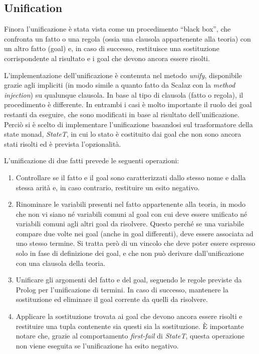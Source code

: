 \subsection{Unification}

Finora l'unificazione è stata vista come un procedimento ``black box'', che confronta un fatto o una regola (ossia una clausola appartenente alla teoria) con un altro fatto (goal) e, in caso di successo, restituisce una sostituzione corrispondente al risultato e i goal che devono ancora essere risolti.

L'implementazione dell'unificazione è contenuta nel metodo \textit{unify}, disponibile grazie agli impliciti (in modo simile a quanto fatto da Scalaz con la \textit{method injection}) su qualunque clausola. In base al tipo di clausola (fatto o regola), il procedimento è differente. In entrambi i casi è molto importante il ruolo dei goal restanti da eseguire, che sono modificati in base al risultato dell'unificazione. Perciò si è scelto di implementare l'unificazione basandosi sul trasformatore della state monad, \textit{StateT}, in cui lo stato è costituito dai goal che non sono ancora stati risolti ed è prevista l'opzionalità.

L'unificazione di due fatti prevede le seguenti operazioni:

\begin{enumerate}
\item Controllare se il fatto e il goal sono caratterizzati dallo stesso nome e dalla stessa arità e, in caso contrario, restituire un esito negativo.
\item Rinominare le variabili presenti nel fatto appartenente alla teoria, in modo che non vi siano né variabili comuni al goal con cui deve essere unificato né variabili comuni agli altri goal da risolvere. Questo perché se una variabile compare due volte nei goal (anche in goal differenti), deve essere associata ad uno stesso termine. Si tratta però di un vincolo che deve poter essere espresso solo in fase di definizione dei goal, e che non può derivare dall'unificazione con una clausola della teoria.
\item Unificare gli argomenti del fatto e del goal, seguendo le regole previste da Prolog per l'unificazione di termini. In caso di successo, mantenere la sostituzione ed eliminare il goal corrente da quelli da risolvere.
\item Applicare la sostituzione trovata ai goal che devono ancora essere risolti e restituire una tupla contenente sia questi sia la sostituzione. È importante notare che, grazie al comportamento \textit{first-fail} di \textit{StateT}, questa operazione non viene eseguita se l'unificazione ha esito negativo.
\end{enumerate}

